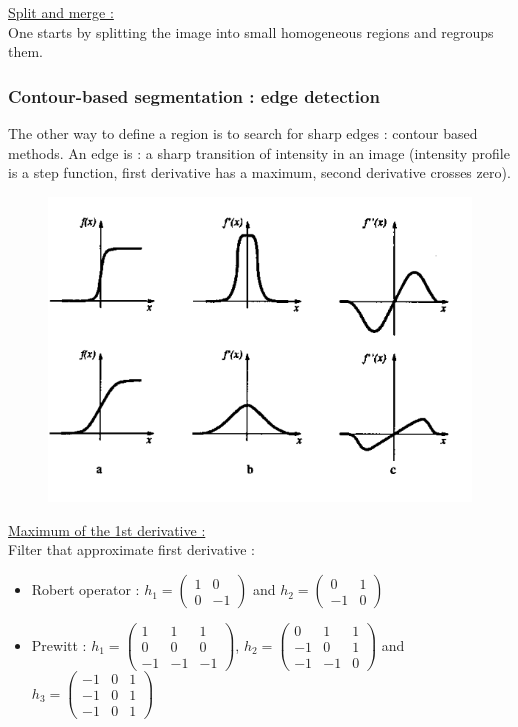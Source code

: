 \documentclass[../main.tex]{subfiles}
\begin{document}
\quad \underline{Split and merge :}\\
One starts by splitting the image into small homogeneous regions and regroups them.\\


\subsubsection{Contour-based segmentation : edge detection}
The other way to define a region is to search for sharp edges : contour based methods. An edge is : a sharp transition of intensity in an image (intensity profile is a step function, first derivative has a maximum, second derivative crosses zero).\\

\begin{figure}[hbt!]
    \centering
    \includegraphics[width=0.5\linewidth]{IMAGES/Indus_el/Screenshot from 2025-03-02 19-33-34.png}
\end{figure}

\quad \underline{Maximum of the 1st derivative :}\\
Filter that approximate first derivative : 
\begin{itemize}
    \item Robert operator : $h_1 = \begin{pmatrix}
        1 & 0\\ 0 &-1
    \end{pmatrix}$ and $h_2 = \begin{pmatrix}
        0 & 1\\ -1 & 0
    \end{pmatrix}$
    \item Prewitt : $h_1 = \begin{pmatrix}
        1 & 1 & 1\\0&0&0\\-1&-1&-1
    \end{pmatrix}$, $h_2 = \begin{pmatrix}
        0&1&1\\-1&0&1\\-1&-1&0
    \end{pmatrix}$ and $h_3 = \begin{pmatrix}
        -1&0&1\\-1&0&1\\-1&0&1
    \end{pmatrix}$
\end{itemize}
\end{document}
